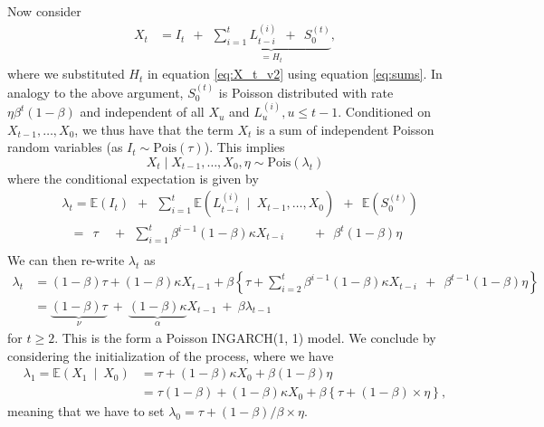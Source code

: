 \documentclass[review]{elsarticle}
\begin{document}
Now consider %
\begin{align}
X_t & = I_t \ \ + \ \ \underbrace{\sum_{i = 1}^{t} L_{t - i}^{(i)} \ \ + \ \ S_0^{(t)}}_{= H_t}, \label{eq:introduce_N_T}
\end{align}
where we substituted $H_t$ in equation \eqref{eq:X_t_v2} using equation \eqref{eq:sums}. In analogy to the above argument, $S_0^{(t)}$ is Poisson distributed with rate $\eta\beta^{t}(1 - \beta)$ and independent of all $X_u$ and $L_u^{(i)}, u \leq t - 1$. Conditioned on $X_{t - 1}, \dots, X_0$, we thus have that the term $X_t$ is a sum of independent Poisson random variables (as $I_t \sim \text{Pois}(\tau)$). This implies
$$
X_t \mid X_{t - 1}, \dots, X_0, \eta \sim \text{Pois}(\lambda_t)
$$
where the conditional expectation is given by
\begin{align*}
& \lambda_t = \mathbb{E}(I_t) \ \ + \ \ \sum_{i = 1}^t \mathbb{E}(L_{t - i}^{(i)} \ \mid \ X_{t- 1}, \dots, X_0) \ \ + \ \ \mathbb{E}(S_0^{(t)})\\
& \ \ \ = \ \ \tau \ \ \ \ \ + \ \ \sum_{i = 1}^t \beta^{i - 1}(1 - \beta)\kappa X_{t - i} \ \ \ \ \ \ \ \ \ \ + \ \ \beta^{t}(1 - \beta)\eta\\
\end{align*}
We can then re-write $\lambda_t$ as
\begin{align*}
\lambda_t & = (1 - \beta)\tau + (1 - \beta)\kappa X_{t - 1} + \beta \left\{\tau +    \sum_{i = 2}^t \beta^{i - 1}(1 - \beta)\kappa X_{t - i}  \ \ + \ \ \beta^{t - 1}(1 - \beta)\eta\right\}\\
& = \underbrace{(1 - \beta)\tau}_{\nu} \ + \ \underbrace{(1 - \beta)\kappa}_{\alpha} X_{t - 1} \ + \ \beta \lambda_{t - 1}
\end{align*}
for $t \geq 2$. This is the form a Poisson INGARCH(1, 1) model. We conclude by considering the initialization of the process, where we have
\begin{align*}
\lambda_1 = \mathbb{E}(X_1 \ \mid \ X_0) & = \tau + (1 - \beta)\kappa X_0 + \beta(1 - \beta)\eta\\
& =  \tau (1 - \beta) + (1 - \beta)\kappa X_0 + \beta  \left\{\tau + (1 - \beta) \times \eta \right\},
\end{align*}
meaning that we have to set $\lambda_0 =\tau + (1 - \beta)/\beta \times \eta$.
\end{document}
